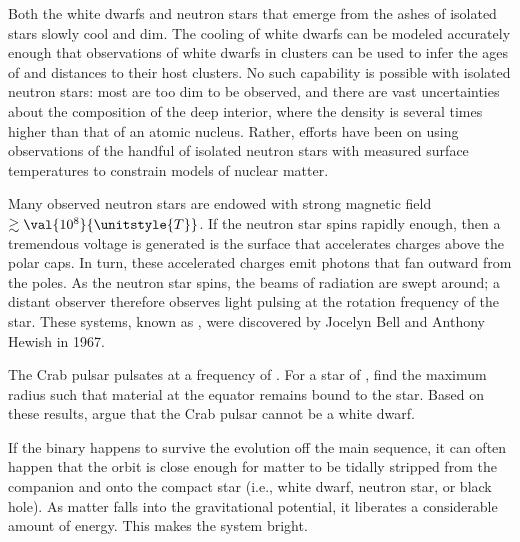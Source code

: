 Both the white dwarfs and neutron stars that emerge from the ashes of isolated stars slowly cool and dim. The cooling of white dwarfs can be modeled accurately enough that observations of white dwarfs in clusters can be used to infer the ages of and distances to their host clusters. No such capability is possible with isolated neutron stars: most are too dim to be observed, and there are vast uncertainties about the composition of the deep interior, where the density is several times higher than that of an atomic nucleus. Rather, efforts have been on using observations of the handful of isolated neutron stars with measured surface temperatures to constrain models of nuclear matter.

Many observed neutron stars are endowed with strong magnetic field $\gtrsim\val{10^{8}}{\unitstyle{T}}$. If the neutron star spins rapidly enough, then a tremendous voltage is generated is the surface that accelerates charges above the polar caps. In turn, these accelerated charges emit photons that fan outward from the poles. As the neutron star spins, the beams of radiation are swept around; a distant observer therefore observes light pulsing at the rotation frequency of the star. These systems, known as , were discovered by Jocelyn Bell and Anthony Hewish in 1967.

\begin{exercisebox}
The Crab pulsar pulsates at a frequency of . For a star of , find the maximum radius such that material at the equator remains bound to the star. Based on these results, argue that the Crab pulsar cannot be a white dwarf.
\end{exercisebox}

 If the binary happens to survive the evolution off the main sequence, it can often happen that the orbit is close enough for matter to be tidally stripped from the companion and  onto the compact star (i.e., white dwarf, neutron star, or black hole). As matter falls into the gravitational potential, it liberates a considerable amount of energy. This makes the system bright.

